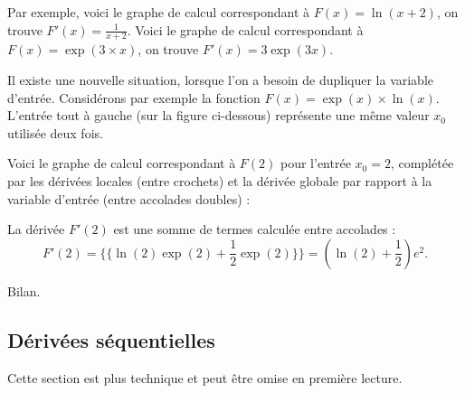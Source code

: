 \documentclass[11pt,class=report,crop=false]{standalone}
\begin{document}
Par exemple, voici le graphe de calcul correspondant à $F(x) = \ln(x+2)$, on trouve $F'(x) = \frac{1}{x+2}$.
Voici le graphe de calcul correspondant à $F(x) = \exp(3\times x)$, on trouve $F'(x) = 3\exp(3x)$.

Il existe une nouvelle situation, lorsque l'on a besoin de dupliquer la variable d'entrée. Considérons par exemple la fonction $F(x) = \exp(x)\times \ln(x)$.
L'entrée \og{}\textbullet\fg{} tout à gauche (sur la figure ci-dessous) représente une même valeur $x_0$ utilisée deux fois.




Voici le graphe de calcul correspondant à $F(2)$ pour l'entrée $x_0=2$, complétée par les dérivées locales (entre crochets) et la dérivée globale par rapport à la variable d'entrée (entre accolades doubles) :

La dérivée $F'(2)$ est une somme de termes calculée entre accolades  :
$$F'(2) = \{\{ \ln(2)\exp(2) + \frac12\exp(2) \}\} = \left(\ln(2)+\frac12\right)e^2.$$



Bilan.



\subsection{Dérivées séquentielles}

Cette section est plus technique et peut être omise %
en première lecture.

\bigskip
\end{document}
